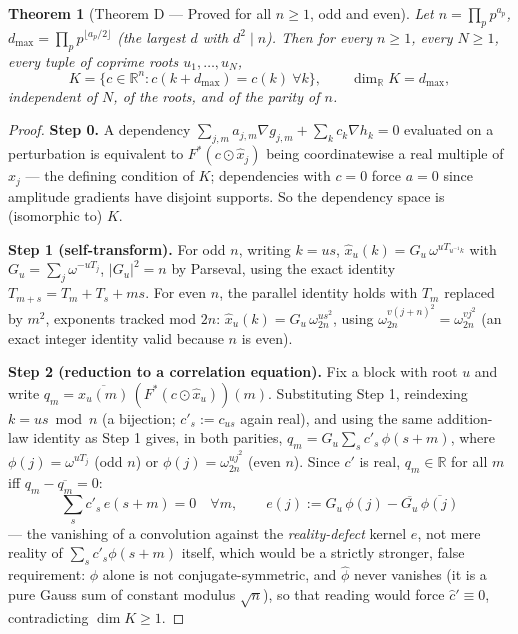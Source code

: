 \documentclass[11pt]{article}
\theoremstyle{plain}
\newtheorem{theorem}{Theorem}[section]
\theoremstyle{definition}
\theoremstyle{remark}
\newcommand{\R}{\mathbb R}
\begin{document}
\begin{theorem}[Theorem D --- Proved for all $n\ge1$, odd and even]\label{thm:D}
Let $n=\prod_p p^{a_p}$, $d_{\max}=\prod_p p^{\lfloor a_p/2\rfloor}$ (the
largest $d$ with $d^2\mid n$). Then for every $n\ge1$, every $N\ge1$, every
tuple of coprime roots $u_1,\dots,u_N$,
$$K=\{c\in\R^n: c(k+d_{\max})=c(k)\ \forall k\},\qquad \dim_\R K=d_{\max},$$
independent of $N$, of the roots, and of the parity of $n$.
\end{theorem}
\begin{proof}
\textbf{Step 0.} A dependency $\sum_{j,m}a_{j,m}\nabla g_{j,m}+\sum_kc_k\nabla h_k=0$
evaluated on a perturbation is equivalent to $F^*(c\odot\widehat x_j)$
being coordinatewise a real multiple of $x_j$ --- the defining condition
of $K$; dependencies with $c=0$ force $a=0$ since amplitude gradients have
disjoint supports. So the dependency space is (isomorphic to) $K$.

\textbf{Step 1 (self-transform).} For odd $n$, writing $k=us$,
$\widehat x_u(k)=G_u\,\omega^{uT_{u^{-1}k}}$ with $G_u=\sum_j\omega^{-uT_j}$,
$|G_u|^2=n$ by Parseval, using the exact identity $T_{m+s}=T_m+T_s+ms$. For
even $n$, the parallel identity holds with $T_m$ replaced by $m^2$,
exponents tracked mod $2n$: $\widehat x_u(k)=G_u\,\omega_{2n}^{us^2}$,
using $\omega_{2n}^{v(j+n)^2}=\omega_{2n}^{vj^2}$ (an exact integer
identity valid because $n$ is even).

\textbf{Step 2 (reduction to a correlation equation).} Fix a block with
root $u$ and write $q_m=\overline{x_u(m)}\,(F^*(c\odot\widehat x_u))(m)$.
Substituting Step 1, reindexing $k=us\bmod n$ (a bijection; $c'_s:=c_{us}$
again real), and using the same addition-law identity as Step 1 gives, in
both parities, $q_m=G_u\sum_sc'_s\,\phi(s+m)$, where $\phi(j)=\omega^{uT_j}$
(odd $n$) or $\phi(j)=\omega_{2n}^{uj^2}$ (even $n$). Since $c'$ is real,
$q_m\in\R$ for all $m$ iff $q_m-\overline{q_m}=0$:
$$\sum_sc'_s\,e(s+m)=0\quad\forall m,\qquad e(j):=G_u\,\phi(j)-\overline{G_u}\,\overline{\phi(j)}$$
--- the vanishing of a convolution against the \emph{reality-defect}
kernel $e$, not mere reality
of $\sum_sc'_s\phi(s+m)$ itself, which would be a strictly stronger, false
requirement: $\phi$ alone is not conjugate-symmetric, and $\hat\phi$ never
vanishes (it is a pure Gauss sum of constant modulus $\sqrt n$), so that
reading would force $\hat c'\equiv0$, contradicting $\dim K\ge1$.


\end{proof}
\end{document}
